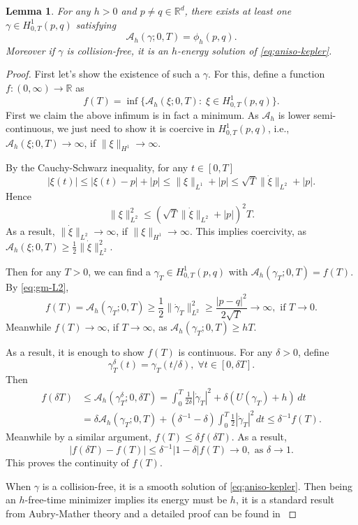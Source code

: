 \documentclass[11pt]{amsart}
\newcommand{\rr}{\mathbb R}
\newcommand{\A}{\mathcal A}
\newcommand{\gm}{\gamma}
\newcommand{\dl}{\delta}
\newcommand{\ey}{\frac{1}{2}}
\theoremstyle{plain}
\newtheorem{lem}{Lemma}[section]
\theoremstyle{definition}
\theoremstyle{remark}
\begin{document}
\begin{lem}
\label{lem;exist-free-minimizer} For any $h>0$ and $p \ne q \in \rr^d$, there exists at least one $\gm \in H^1_{0, T}(p, q)$ satisfying 
$$ \A_h(\gm; 0, T) = \phi_h(p, q). $$
Moreover if $\gm$ is collision-free, it is an $h$-energy solution of \eqref{eq;aniso-kepler}.
\end{lem}
\begin{proof}
First let's show the existence of such a $\gm$. For this, define a function $f: (0, \infty) \to \rr$ as 
$$  f(T) = \inf \{ \A_h(\xi; 0, T): \; \xi \in H^1_{0, T}(p, q) \}. $$
First we claim the above infimum is in fact a minimum. As $\A_h$ is lower semi-continuous, we just need to show it is coercive in $H^1_{0, T}(p, q)$, i.e., $\A_h(\xi; 0, T) \to \infty$, if $\|\xi\|_{H^1} \to \infty$. 

By the Cauchy-Schwarz inequality, for any $t \in [0, T]$
\begin{equation}
\label{eq;gm-L2} |\xi(t)| \le |\xi(t)-p| + |p| \le \|\xi\|_{L^1} + |p| \le \sqrt{T}\|\dot{\xi}\|_{L^2} + |p|.
\end{equation}
Hence 
$$ \|\xi\|_{L^2}^2 \le (\sqrt{T}\|\dot{\xi}\|_{L^2} + |p|)^2 T. $$
As a result, $\|\dot{\xi}\|_{L^2} \to \infty$, if $\|\xi\|_{H^1} \to \infty$. This implies coercivity, as $\A_h(\xi; 0, T) \ge \ey \|\dot{\xi}\|^2_{L^2}$.

Then for any $T>0$, we can find a $\gm_T \in H^1_{0, T}(p, q)$ with $\A_h(\gm_T; 0, T) = f(T)$. By \eqref{eq;gm-L2},   
$$f(T)= \A_h(\gm_T;0, T) \ge \ey \|\dot{\gm}_T\|^2_{L^2} \ge \frac{|p -q|^2}{2\sqrt{T}} \to \infty, \text{ if } T \to 0. $$
Meanwhile $f(T) \to \infty$, if $T \to \infty$, as $\A_h(\gm_T; 0, T) \ge hT$. 

As a result, it is enough to show $f(T)$ is continuous. For any $\dl>0$, define
$$ \gm^{\dl}_T(t) = \gm_T(t/\dl), \; \forall t \in [0, \dl T]. $$
Then 
$$  \begin{aligned}
f(\dl T) & \le \A_h(\gm^{\dl}_T; 0, \dl T) = \int_0^T \frac{1}{2 \dl} |\dot{\gm}_T|^2 + \dl (U(\gm_T) + h) \,dt \\
& = \dl \A_h(\gm_T; 0, T) + (\dl^{-1}-\dl) \int_0^T \ey |\dot{\gm}_T|^2 \,dt \le \dl^{-1} f(T). 
\end{aligned}
$$
Meanwhile by a similar argument, $f(T) \le \dl f(\dl T)$. As a result, 
$$ |f(\dl T) -f(T)| \le \dl^{-1}|1-\dl| f(T) \to 0, \text{ as } \dl \to 1. $$
This proves the continuity of $f(T)$.

When $\gm$ is a collision-free, it is a smooth solution of \eqref{eq;aniso-kepler}. Then being an $h$-free-time minimizer implies its energy must be $h$, it is a standard result from Aubry-Mather theory and a detailed proof can be found in \cite[Proposition 4.1.23]{So15}
\end{proof}
\end{document}
